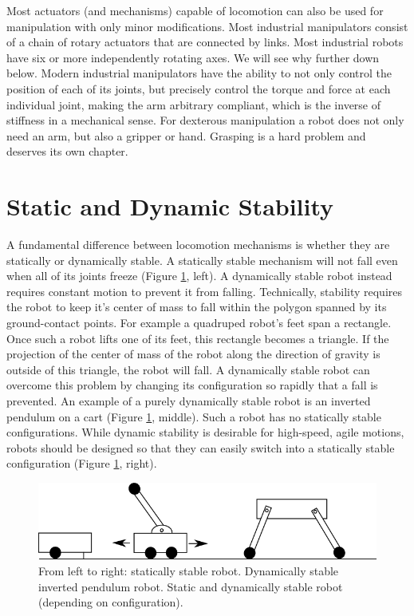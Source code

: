 Most actuators (and mechanisms) capable of locomotion can also be used for manipulation with only minor modifications. Most industrial manipulators consist of a chain of rotary actuators that are connected by links. Most industrial robots have six or more independently rotating axes. We will see why further down below. Modern industrial manipulators have the ability to not only control the position of each of its joints, but precisely control the torque and force at each individual joint, making the arm arbitrary compliant, which is the inverse of stiffness in a mechanical sense. For dexterous manipulation a robot does not only need an arm, but also a gripper or hand. Grasping is a hard problem and deserves its own chapter. 


\section{Static and Dynamic Stability}\label{sec:stability}
A fundamental difference between locomotion mechanisms is whether they are statically or dynamically stable. A statically stable mechanism will not fall even when all of its joints freeze (Figure \ref{fig:stability}, left). A dynamically stable robot instead requires constant motion to prevent it from falling. Technically, stability requires the robot to keep it's center of mass to fall within the polygon spanned by its ground-contact points. For example a quadruped robot's feet span a rectangle. Once such a robot lifts one of its feet, this rectangle becomes a triangle. If the projection of the center of mass of the robot along the direction of gravity is outside of this triangle, the robot will fall. A dynamically stable robot can overcome this problem by changing its configuration so rapidly that a fall is prevented. An example of a purely dynamically stable robot is an inverted pendulum on a cart  (Figure \ref{fig:stability}, middle). Such a robot has no statically stable configurations. While dynamic stability is desirable for high-speed, agile motions, robots should be designed so that they can easily switch into a statically stable configuration (Figure \ref{fig:stability}, right). 

\begin{figure}
	\centering
		\includegraphics[width=\textwidth]{figs/stability.png}
	\caption{From left to right: statically stable robot. Dynamically stable inverted pendulum robot. Static and dynamically stable robot (depending on configuration).}
	\label{fig:stability}
\end{figure}

